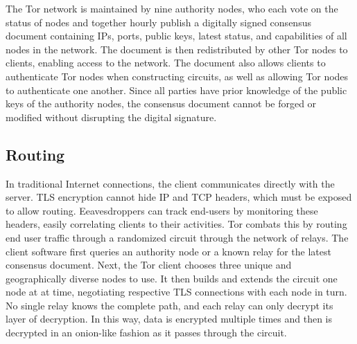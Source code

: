 The Tor network is maintained by nine authority nodes, who each vote on the status of nodes and together hourly publish a digitally signed consensus document containing IPs, ports, public keys, latest status, and capabilities of all nodes in the network. The document is then redistributed by other Tor nodes to clients, enabling access to the network. The document also allows clients to authenticate Tor nodes when constructing circuits, as well as allowing Tor nodes to authenticate one another. Since all parties have prior knowledge of the public keys of the authority nodes, the consensus document cannot be forged or modified without disrupting the digital signature.\cite{xin2009design}

\subsection{Routing}

In traditional Internet connections, the client communicates directly with the server. TLS encryption cannot hide IP and TCP headers, which must be exposed to allow routing. Eeavesdroppers can track end-users by monitoring these headers, easily correlating clients to their activities. Tor combats this by routing end user traffic through a randomized circuit through the network of relays. The client software first queries an authority node or a known relay for the latest consensus document. Next, the Tor client chooses three unique and geographically diverse nodes to use. It then builds and extends the circuit one node at at time, negotiating respective TLS connections with each node in turn. No single relay knows the complete path, and each relay can only decrypt its layer of decryption. In this way, data is encrypted multiple times and then is decrypted in an onion-like fashion as it passes through the circuit.

